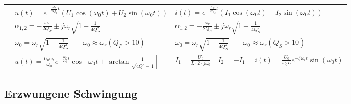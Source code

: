 \begin{tabular}{| p{4cm} | p{7cm} | p{7cm} |}
	  & $u(t) = e^{-\frac{\omega_r}{2Q_p}t}(U_1\cos(\omega_0 t)+U_2\sin(\omega_0
	  t))$
	  & $i(t) = e^{-\frac{\omega_r}{2Q_s}t}(I_1\cos(\omega_0 t)+I_2\sin(\omega_0
	  t))$\\
		& $\alpha_{1,2} = - \frac{\omega_r}{2 Q_P} \pm j \omega_r \sqrt{1 - \frac{1}{4 Q_P^2}}$	
		& $\alpha_{1,2} = - \frac{\omega_r}{2 Q_S} \pm j \omega_r \sqrt{1 - \frac{1}{4 Q_S^2}}$	\\
		& $\omega_0 = \omega_r \sqrt{1 - \frac{1}{4 Q_P^2}} \qquad \omega_0 \approx \omega_r (Q_P > 10)$ 
		& $\omega_0 = \omega_r \sqrt{1 - \frac{1}{4 Q_S^2}} \qquad \omega_0 \approx\omega_r (Q_S > 10)$\\
		& $u(t) = \frac{U_0 \omega_r}{\omega_0} e^{- \frac{\omega_r}{2
					Q} t} \cos{[\omega_0 t + \arctan{\frac{1}{\sqrt{4 Q^2 -1}}}]}$
		& $I_1 =  \frac{U_0}{L \cdot 2 \cdot j \omega_0} \quad I_2 = -I_1$
		$ \quad i(t) = \frac{U_0}{\omega_0 L} e^{-\xi  \omega_r  t} \sin{(\omega_0 t)}$
		\\
	\hline
	\end{tabular}
	
\renewcommand{\arraystretch}{\arraystretchOriginal}


\subsection{Erzwungene Schwingung}	


